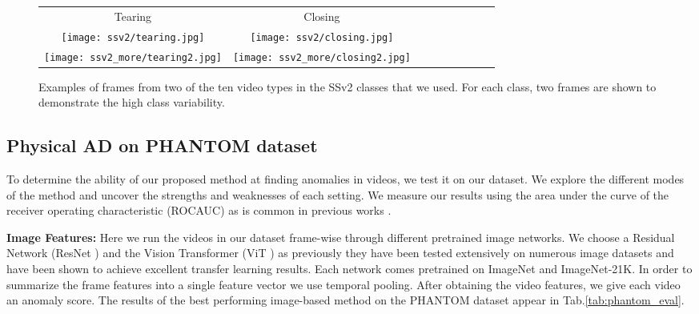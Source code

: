 \documentclass{article}
\begin{document}
\begin{figure}[t]
\begin{center}
\begin{tabular}{@{\hskip0pt}c@{\hskip5pt}c@{\hskip5pt}c@{\hskip5pt}c@{\hskip5pt}c@{\hskip5pt}c@{\hskip0pt}c@{\hskip0pt}c@{\hskip0pt}c}

Tearing & Closing\\

\texttt{[image: ssv2/tearing.jpg]} &
\texttt{[image: ssv2/closing.jpg]} \\
\texttt{[image: ssv2\_more/tearing2.jpg]} &
\texttt{[image: ssv2\_more/closing2.jpg]} \\

\end{tabular}
\end{center}
\caption{Examples of frames from two of the ten video types in the SSv2 classes that we used. For each class, two frames are shown to demonstrate the high class variability.}
\label{fig:ffhq}
\vspace{-1em}
\end{figure}


\subsection{Physical AD on PHANTOM dataset}

To determine the ability of our proposed method at finding anomalies in videos, we test it on our dataset. We explore the different modes of the method and uncover the strengths and weaknesses of each setting. We measure our results using the area under the curve of the receiver operating characteristic (ROCAUC) as is common in previous works \cite{reiss2021panda,hendrycks2019using}.


\textbf{Image Features: }Here we run the videos in our dataset frame-wise through different pretrained image networks. We choose a Residual Network (ResNet \cite{he2016deep}) and the Vision Transformer (ViT \cite{dosovitskiy2020image}) as previously they have been tested extensively on numerous image datasets and have been shown to achieve excellent transfer learning results. Each network comes pretrained on ImageNet and ImageNet-21K. In order to summarize the frame features into a single feature vector we use temporal pooling. After obtaining the video features, we give each video an anomaly score. The results of the best performing image-based method on the PHANTOM dataset appear in Tab.\ref{tab:phantom_eval}. 
\end{document}
